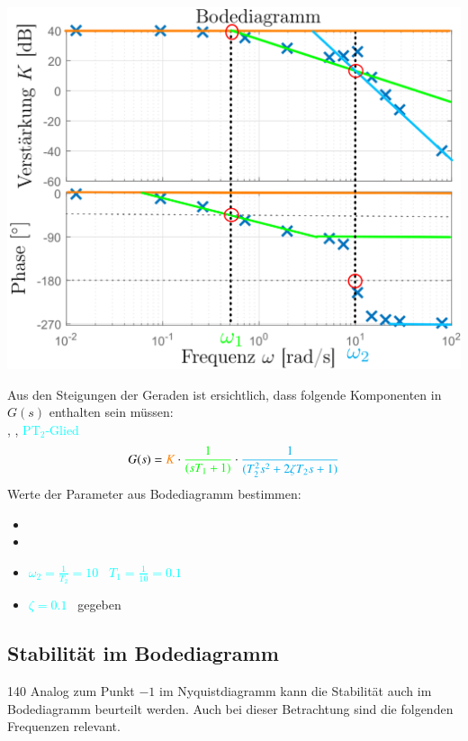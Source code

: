 \begin{minipage}[c]{0.5\columnwidth}
    \includegraphics[width=\columnwidth]{images/bode_zu_modell.png}
\end{minipage}
\hfill
\begin{minipage}[c]{0.48\columnwidth}
    Aus den Steigungen der Geraden ist ersichtlich, dass folgende Komponenten in $G(s)$ enthalten sein müssen: \\
    , , \textcolor{cyan}{$\text{PT}_2$-Glied}
    $$ G(s) = {\color{orange}K} \cdot {\color{green}\frac{1}{(s T_1 + 1)}} \cdot \textcolor{cyan}{\frac{1}{(T_2^2 s^2 + 2 \zeta T_2 s + 1)}} $$
    Werte der Parameter aus Bodediagramm bestimmen:
    \begin{itemize}
        \item {}
        \item {}
        \item \textcolor{cyan}{$\omega_2 = \frac{1}{T_2} = 10$ \textrightarrow\ $T_1 = \frac{1}{10} = 0.1$}
        \item \textcolor{cyan}{$\zeta = 0.1$} \textrightarrow\ gegeben 
    \end{itemize}
\end{minipage}



\subsection{Stabilität im Bodediagramm}{140}
Analog zum Punkt $-1$ im Nyquistdiagramm kann die Stabilität auch im Bodediagramm beurteilt werden. Auch bei dieser Betrachtung 
sind die folgenden Frequenzen relevant.

